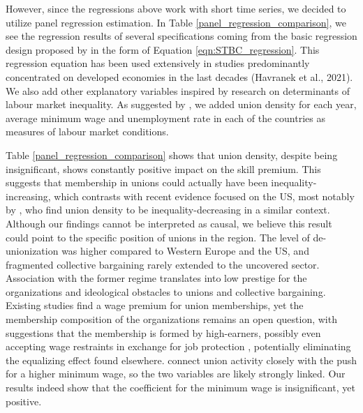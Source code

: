 \documentclass[11pt]{article}
\begin{document}
However, since the regressions above work with short time series, we decided to utilize panel regression estimation. In Table \ref{panel_regression_comparison}, we see the regression results of several specifications coming from the basic regression design proposed by \citet{katz1992changes} in the form of Equation \ref{eqn:STBC_regression}. This regression equation has been used extensively in studies predominantly concentrated on developed economies in the last decades (Havranek et al., 2021). We also add other explanatory variables inspired by research on determinants of labour market inequality. As suggested by \citet{farber2021unions}, we added union density for each year, average minimum wage and unemployment rate in each of the countries as measures of labour market conditions. %

Table \ref{panel_regression_comparison} shows that union density, despite 
being insignificant, shows constantly positive impact on the skill premium. This suggests that membership in unions could actually have been inequality-increasing, which contrasts with recent evidence focused on the US, most notably by \citet{farber2021unions}, who find union density to be inequality-decreasing in a similar context. Although our findings cannot be interpreted as causal, we believe this result could point to the specific position of unions in the region. The level of de-unionization was higher compared to Western Europe and the US, and fragmented collective bargaining rarely extended to the uncovered sector. Association with the former regime translates into low prestige for the organizations and ideological obstacles to unions and collective bargaining. Existing studies find a wage premium for union memberships, yet the membership composition of the organizations remains an open question, with suggestions that the membership is formed by high-earners, possibly even accepting wage restraints in exchange for job protection \citep{magda2017trade}, potentially eliminating the equalizing effect found elsewhere. \citet{farber2021unions} connect union activity closely with the push for a higher minimum wage, so the two variables are likely strongly linked. Our results indeed show that the coefficient for the minimum wage is insignificant, yet positive.
\end{document}
